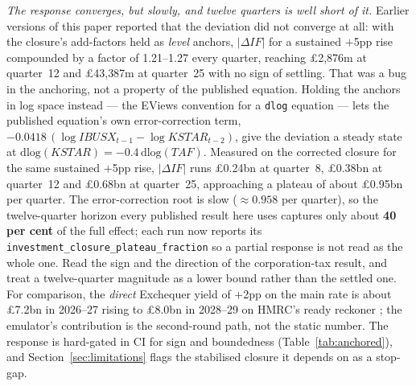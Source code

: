 \emph{The response converges, but slowly, and twelve quarters is well short of it.} Earlier versions of this paper reported that the deviation did not converge at all: with the closure's add-factors held as \emph{level} anchors, $|\Delta IF|$ for a sustained $+$5pp rise compounded by a factor of 1.21--1.27 every quarter, reaching \pounds 2{,}876m at quarter~12 and \pounds 43{,}387m at quarter~25 with no sign of settling. That was a bug in the anchoring, not a property of the published equation. Holding the anchors in log space instead --- the EViews convention for a \texttt{dlog} equation --- lets the published equation's own error-correction term, $-0.0418\,(\log IBUSX_{t-1} - \log KSTAR_{t-2})$, give the deviation a steady state at $\mathrm{dlog}(KSTAR) = -0.4\,\mathrm{dlog}(TAF)$. Measured on the corrected closure for the same sustained $+$5pp rise, $|\Delta IF|$ runs \pounds 0.24bn at quarter~8, \pounds 0.38bn at quarter~12 and \pounds 0.68bn at quarter~25, approaching a plateau of about \pounds 0.95bn per quarter. The error-correction root is slow ($\approx 0.958$ per quarter), so the twelve-quarter horizon every published result here uses captures only about \textbf{40 per cent} of the full effect; each run now reports its \texttt{investment\_closure\_plateau\_fraction} so a partial response is not read as the whole one. Read the sign and the direction of the corporation-tax result, and treat a twelve-quarter magnitude as a lower bound rather than the settled one. For comparison, the \emph{direct} Exchequer yield of $+$2pp on the main rate is about \pounds 7.2bn in 2026--27 rising to \pounds 8.0bn in 2028--29 on HMRC's ready reckoner \citep{hmrc2025reckoner}; the emulator's contribution is the second-round path, not the static number. The response is hard-gated in CI for sign and boundedness (Table~\ref{tab:anchored}), and Section~\ref{sec:limitations} flags the stabilised closure it depends on as a stop-gap.

